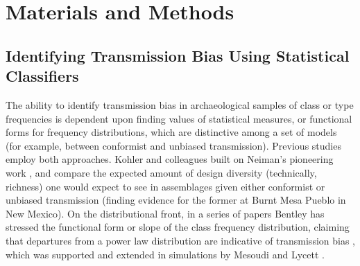 \documentclass[10pt,letterpaper]{article}
\begin{document}
\section{Materials and Methods}
\label{analysis}


\subsection{Identifying Transmission Bias Using Statistical Classifiers}
\label{sec:equifinality-classification-error}

The ability to identify transmission bias in archaeological samples of class or type frequencies is dependent upon finding values of statistical measures, or functional forms for frequency distributions, which are distinctive among a set of models (for example, between conformist and unbiased transmission).  Previous studies employ both approaches.  Kohler and colleagues \cite{kohler2004} built on Neiman's pioneering work \cite{Neiman:1995p23690}, and compare the expected amount of design diversity (technically, richness) one would expect to see in assemblages given either conformist or unbiased transmission (finding evidence for the former at Burnt Mesa Pueblo in New Mexico).  On the distributional front, in a series of papers Bentley has stressed the functional form or slope of the class frequency distribution, claiming that departures from a power law distribution are indicative of transmission bias \cite{Bentley2003,bentley2004random,bentley2007regular}, which was supported and extended in simulations by Mesoudi and Lycett \cite{Mesoudi2009}.  
\end{document}
